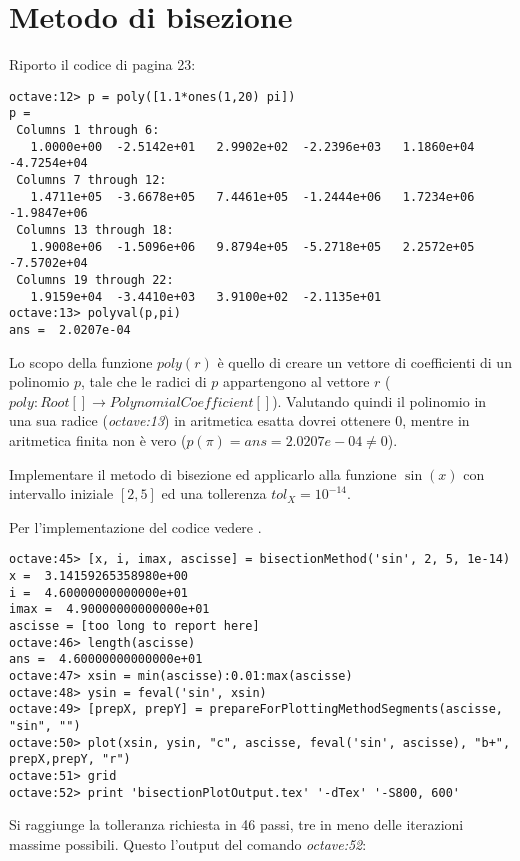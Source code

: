 \section{Metodo di bisezione}
\label{sec:metodoDiBisezione}
Riporto il codice di pagina 23:
\begin{lstlisting}
octave:12> p = poly([1.1*ones(1,20) pi])
p =
 Columns 1 through 6:
   1.0000e+00  -2.5142e+01   2.9902e+02  -2.2396e+03   1.1860e+04  -4.7254e+04
 Columns 7 through 12:
   1.4711e+05  -3.6678e+05   7.4461e+05  -1.2444e+06   1.7234e+06  -1.9847e+06
 Columns 13 through 18:
   1.9008e+06  -1.5096e+06   9.8794e+05  -5.2718e+05   2.2572e+05  -7.5702e+04
 Columns 19 through 22:
   1.9159e+04  -3.4410e+03   3.9100e+02  -2.1135e+01
octave:13> polyval(p,pi)
ans =  2.0207e-04
\end{lstlisting}
Lo scopo della funzione $poly(r)$ \`e quello di creare un vettore di coefficienti
di un polinomio $p$, tale che le radici di $p$ appartengono al vettore $r$ 
($poly: Root[] \rightarrow PolynomialCoefficient[]$).
Valutando quindi il polinomio in una sua radice (\emph{octave:13}) in aritmetica
esatta dovrei ottenere 0, mentre in aritmetica finita non \`e vero 
($p(\pi) = ans =  2.0207e-04 \not = 0$).

\begin{exercise}
Implementare il metodo di bisezione ed applicarlo alla funzione $\sin(x)$ 
con intervallo iniziale $[2, 5]$ ed una tollerenza $tol_{X} = 10^{-14}$.
\end{exercise}
Per l'implementazione del codice vedere .
\begin{lstlisting}
octave:45> [x, i, imax, ascisse] = bisectionMethod('sin', 2, 5, 1e-14)
x =  3.14159265358980e+00
i =  4.60000000000000e+01
imax =  4.90000000000000e+01
ascisse = [too long to report here]
octave:46> length(ascisse)
ans =  4.60000000000000e+01
octave:47> xsin = min(ascisse):0.01:max(ascisse)
octave:48> ysin = feval('sin', xsin)
octave:49> [prepX, prepY] = prepareForPlottingMethodSegments(ascisse, "sin", "")
octave:50> plot(xsin, ysin, "c", ascisse, feval('sin', ascisse), "b+", prepX,prepY, "r") 
octave:51> grid
octave:52> print 'bisectionPlotOutput.tex' '-dTex' '-S800, 600'
\end{lstlisting}
Si raggiunge la tolleranza richiesta in 46 passi, tre in meno delle iterazioni
massime possibili. Questo l'output del comando \emph{octave:52}:
\begin{center}

\end{center}

